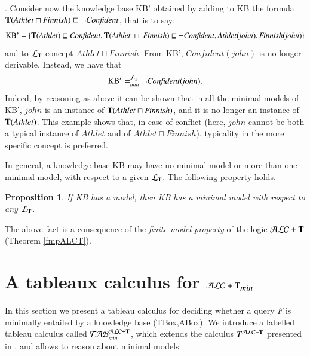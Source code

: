 \documentclass[a4paper, 11pt, oneside]{elsarticle}
\newcommand{\tip}{{\bf T}}
\newcommand{\alct}{\mathcal{ALC}+\tip}
\newcommand{\alctmin}{\mathcal{ALC}+\tip_{\mbox{\em min}}}
\newcommand{\sqset}{\sqsubseteq}
\newcommand{\mint}{\sqcap}
\newcommand{\ellet} {\mathcal{L}_{\bf T}}
\newcommand{\nuovoc}{\mathrel{{\mathcal{T}\!\mathcal{AB}}}_{min}^{\mathcal{ALC}+\mbox{\scriptsize $\tip$}}}
\newcommand{\calcolo}{T^{\mathcal{ALC}+\mbox{\scriptsize $\tip$}}}
\newtheorem{proposition}{Proposition}
\newcounter{posu}
\newtheorem{proposition}[posu]{Proposition}
\begin{document}
. Consider now the knowledge base KB' obtained by adding to KB the
formula $\tip(\mathit{Athlet} \mint \mathit{Finnish}) \sqsubseteq \neg \mathit{Confident}$, that is to say:
$$\mbox{KB'}  = \{ \tip(\mathit{Athlet}) \sqset \mathit{Confident}, \tip(\mathit{Athlet} \ \mint \ \mathit{Finnish}) \sqsubseteq \neg \mathit{Confident},
\mathit{Athlet}(\mathit{john}), \mathit{Finnish}(\mathit{john})\}$$
and to ${\ellet}$ concept
$\mathit{Athlet} \mint \mathit{Finnish}$. From KB', $\mathit{Confident}(\mathit{john})$ is no longer derivable.
Instead, we have that $$\mbox{KB}' \models_{min}^{\ellet} \neg \mathit{Confident}(\mathit{john}).$$ Indeed, by reasoning as above it can be shown that in all the minimal models of KB', $\mathit{john}$ is an instance of $\tip(\mathit{Athlet} \mint \mathit{Finnish})$, and it is
no longer an instance of $\tip(\mathit{Athlet})$. This example shows that, in case of
conflict (here, $\mathit{john}$ cannot be both a typical instance of $\mathit{Athlet}$ and of
$\mathit{Athlet} \mint \mathit{Finnish}$), typicality in the more specific concept is
preferred.

\vspace{0.35cm}

\noindent In general, a knowledge base KB may have no minimal model or more
than one minimal model, with respect to a given $\ellet$. The following property holds.

\begin{proposition}\label{proprModMinimali1}
If \emph{KB} has a model, then \emph{KB} has a minimal model with respect to
any $\ellet$.
\end{proposition}

The above fact  is  a consequence of the \emph{finite model property} of the logic $\alct$ (Theorem \ref{fmpALCT}).




\section{A tableaux calculus for $\alctmin$}

In this section we present a tableau calculus for deciding whether
a query $F$ is minimally entailed by a knowledge base (TBox,ABox).
We introduce a labelled tableau calculus  called $\nuovoc$, which
extends the calculus $\calcolo$ presented in \cite{FI09}, and
allows to reason about minimal models.
\end{document}
